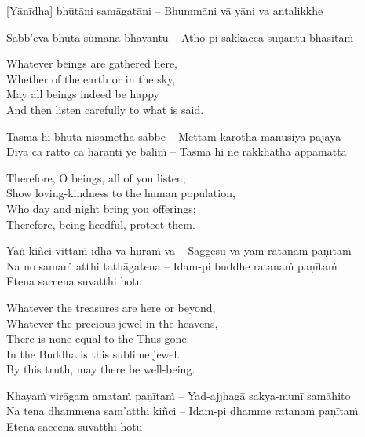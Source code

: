 [Yānīdha] bhūtāni samāgatāni – Bhummāni vā yāni va antalikkhe\\
\begin{pali-hangtogether}
Sabb'eva bhūtā sumanā bhavantu – Atho pi sakkacca suṇantu bhāsitaṁ
\end{pali-hangtogether}

\begin{english-verses}
  Whatever beings are gathered here,\\
  Whether of the earth or in the sky,\\
  May all beings indeed be happy\\
  And then listen carefully to what is said.
\end{english-verses}

Tasmā hi bhūtā nisāmetha sabbe – Mettaṁ karotha mānusiyā pajāya\\
Divā ca ratto ca haranti ye baliṁ – Tasmā hi ne rakkhatha appamattā

\begin{english-verses}
  Therefore, O beings, all of you listen;\\
  Show loving-kindness to the human population,\\
  Who day and night bring you offerings;\\
  Therefore, being heedful, protect them.
\end{english-verses}

Yaṅ kiñci vittaṁ idha vā huraṁ vā – Saggesu vā yaṁ ratanaṁ paṇītaṁ\\
Na no samaṁ atthi tathāgatena – Idam-pi buddhe ratanaṁ paṇītaṁ\\
Etena saccena suvatthi hotu

\begin{english-verses}
  Whatever the treasures are here or beyond,\\
  Whatever the precious jewel in the heavens,\\
  There is none equal to the Thus-gone.\\
  In the Buddha is this sublime jewel.\\
  By this truth, may there be well-being.
\end{english-verses}

Khayaṁ virāgaṁ amataṁ paṇītaṁ – Yad-ajjhagā sakya-munī samāhito\\
Na tena dhammena sam'atthi kiñci – Idam-pi dhamme ratanaṁ paṇītaṁ\\
Etena saccena suvatthi hotu

